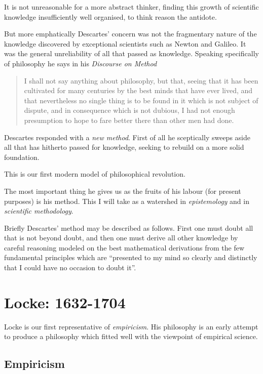 It is not unreasonable for a more abstract thinker, finding this growth of scientific knowledge insufficiently well organised, to think reason the antidote.

But more emphatically Descartes' concern was not the fragmentary nature of the knowledge discovered by exceptional scientists such as Newton and Galileo.
It was the general unreliability of all that passed as knowledge.
Speaking specifically of philosophy he says in his {\it Discourse on Method} \cite{descartesDOM}

\begin{quotation}
I shall not say anything about philosophy, but that, seeing that it has been cultivated for many centuries by the best minds that have ever lived, and that nevertheless no single thing is to be found in it which is not subject of dispute, and in consequence which is not dubious, I had not enough presumption to hope to fare better there than other men had done.
\end{quotation}

Descartes responded with a {\it new method}.
First of all he sceptically sweeps aside all that has hitherto passed for knowledge, seeking to rebuild on a more solid foundation.

This is our first modern model of philosophical revolution.

The most important thing he gives us as the fruits of his labour (for present purposes) is his method.
This I will take as a watershed in {\it epistemology} and in {\it scientific methodology}.

Briefly Descartes' method may be described as follows.
First one must doubt all that is not beyond doubt, and then one must derive all other knowledge by careful reasoning modeled on the best mathematical derivations from the few fundamental principles which are ``presented to my mind so clearly and distinctly that I could have no occasion to doubt it''.


\section{Locke: 1632-1704}

Locke is our first representative of {\it empiricism}.
His philosophy is an early attempt to produce a philosophy which fitted well with the viewpoint of empirical science.

\subsection{Empiricism}

